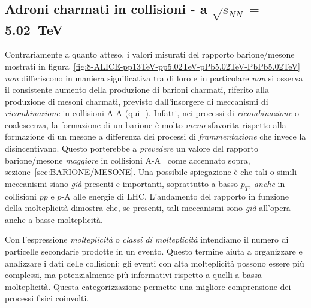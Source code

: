     \subsection{Adroni charmati in collisioni - a $\sqrt{s_{NN}} =$ \qty{5.02}{\tera \eV}}
        Contrariamente a quanto atteso, i valori misurati del rapporto barione/mesone mostrati in figura~\ref{fig:8-ALICE-pp13TeV-pp5.02TeV-pPb5.02TeV-PbPb5.02TeV} \textit{non} differiscono in maniera significativa tra di loro e in particolare \textit{non} si osserva il consistente aumento della produzione di barioni charmati, riferito alla produzione di mesoni charmati, previsto dall'insorgere di meccanismi di \textit{ricombinazione} in collisioni A-A (qui -). Infatti, nei processi di \textit{ricombinazione} o coalescenza, la formazione di un barione è molto \textit{meno} sfavorita rispetto alla formazione di un mesone a differenza dei processi di \textit{frammentazione} che invece la disincentivano. Questo porterebbe a \textit{prevedere} un valore del rapporto barione/mesone \textit{maggiore} in collisioni A-A~\cite{Strazzi_2019} come accennato sopra, sezione~\ref{sec:BARIONE/MESONE}. Una possibile spiegazione è che tali o simili meccanismi siano \textit{già} presenti e importanti, soprattutto a basso $p_T$, \textit{anche} in collisioni $pp$ e $p$-A alle energie di LHC. L'andamento del rapporto in funzione della molteplicità dimostra che, se presenti, tali meccanismi sono \textit{già} all’opera anche a basse molteplicità.

        Con l'espressione \textit{molteplicità} o \textit{classi di molteplicità} intendiamo il numero di particelle secondarie prodotte in un evento. Questo termine aiuta a organizzare e analizzare i dati delle collisioni: gli eventi con alta molteplicità possono essere più complessi, ma potenzialmente più informativi rispetto a quelli a bassa molteplicità. Questa categorizzazione permette una migliore comprensione dei processi fisici coinvolti.

\newpage
        
